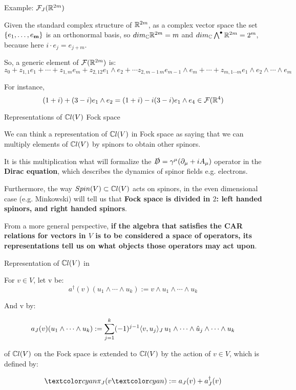 \begin{frame}{Example: $\mathcal F_J(\mathbb R^{2m})$} %
    
    Given the standard complex structure of $\mathbb R^{2m}$, as a complex vector space the set $\{e_1, \dots, e_{\textbf{m}}\}$ is an orthonormal basis, so $dim_\mathbb C\mathbb R^{2m} = m$ and $dim_\mathbb C \bigwedge^\bullet \mathbb R^{2m} = 2^m$, because here $i\cdot e_j = e_{j+m}$.
    
    So, a generic element of $\mathcal F(\mathbb R^{2m})$ is: \quad $z_0 + z_{1,1}e_1 + \cdots + z_{1,m} e_m + z_{2, 12} e_1\wedge e_2 + \cdots z_{2, m-1\, m} e_{m-1} \wedge e_{m} + \cdots + z_{m, 1\cdots m} e_1 \wedge e_2 \wedge \cdots \wedge e_m $
    
    For instance, \[(1+i) + (3-i)e_1 \wedge e_2 = (1+i) - i(3-i) e_1 \wedge e_4 \in \mathcal F(\mathbb R^4)\]
    
\end{frame}

\begin{frame}{Representations of $\mathbb C l(V)$ \Iff Fock space}

    We can think a representation of $\mathbb C l(V)$ in Fock space as saying that we can multiply elements of $\mathbb C l(V)$ by spinors to obtain other spinors. 
    
    It is this multiplication what will formalize the $\slashed D = \gamma^\mu ( \partial_\mu + i A_\mu)$ operator in the \textbf{Dirac equation}, which describes the dynamics of spinor fields e.g. electrons.
    
    Furthermore, the way $Spin(V) \subset \mathbb C l(V)$ acts on spinors, in the even dimensional case (e.g. Minkowski) will tell us that \textbf{Fock space is divided in $2$: left handed spinors, and right handed spinors}.
    
    From a more general perspective, \textbf{if the algebra that satisfies the CAR relations for vectors in $V$ is to be considered a space of operators, its representations tell us on what objects those operators may act upon}.
    
\end{frame}

\begin{frame}{Representation of $\mathbb C l(V)$ in \fjv} %
    
    For $v \in V$, let v be:
    \[ a^\dagger(v) (u_1 \wedge \cdots \wedge u_k) := v \wedge u_1 \wedge \cdots \wedge u_k \]
    
    And v by:
    
    \[ a_J(v) (u_1 \wedge \cdots \wedge u_k) := \sum_{j = 1}^k (-1)^{j-1} \langle v, u_j \rangle_J \, u_1 \wedge \cdots \wedge \hat u_j \wedge \cdots  \wedge u_k \]
    
     of $\mathbb C l(V)$ on the Fock space is extended to $\mathbb C l(V)$ by the action of $v \in V$, which is defined by:
    
    \[ \defn{\pi_J(}v\defn{)} := a_J(v) + a_J^\dagger(v) \]
\end{frame}

